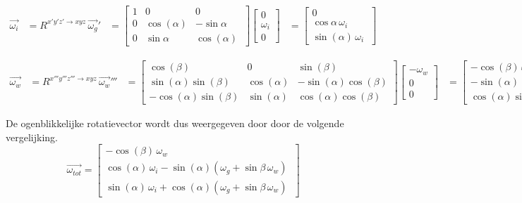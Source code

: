 \begin{equation*}
\begin{split}
\overrightarrow{\omega_{i}}
&=R^{x'y'z' \rightarrow xyz}\,\overrightarrow{\omega_{g}}'
&=	  \begin{bmatrix}
      1 & 0 & 0\\
      0 & \cos(\alpha) & -\sin{\alpha}\\ 
      0 & \sin{\alpha} & \cos(\alpha)\
      \end{bmatrix}
      \begin{bmatrix}
      0\\
      \omega_{i}\\
      0\
      \end{bmatrix}     
&=	  \begin{bmatrix}
      0\\
      \cos{\alpha}\,\omega_{i}\\
      \sin(\alpha)\,\omega_{i}\
      \end{bmatrix}
\end{split}
\end{equation*}

\begin{equation*}
\begin{split}
\overrightarrow{\omega_{w}}
&=R^{x'''y'''z''' \rightarrow xyz}\,\overrightarrow{\omega_{w}}'''
&=	  \begin{bmatrix}
      \cos(\beta) & 0 & \sin(\beta)\\
      \sin(\alpha)\sin(\beta) & \cos(\alpha) & -\sin(\alpha)\cos(\beta)\\
      -\cos(\alpha)\sin(\beta) & \sin(\alpha) & \cos(\alpha)\cos(\beta)\  
      \end{bmatrix}
      \begin{bmatrix}
      -\omega_{w}\\
      0\\
      0\
      \end{bmatrix}
&=    \begin{bmatrix}
      -\cos(\beta)\,\omega_{w}\\
      -\sin(\alpha)\sin(\beta)\,\omega_{w}\\
      \cos(\alpha)\sin(\beta)\,\omega_{w}\
      \end{bmatrix}
\end{split}
\end{equation*}

De ogenblikkelijke rotatievector wordt dus weergegeven door door de volgende vergelijking.
\begin{equation*}
\overrightarrow{\omega_{tot}}=
\begin{bmatrix}
	-\cos(\beta)\,\omega_{w}\\
	\cos(\alpha)\,\omega_{i} - \sin(\alpha)(\omega_{g}+\sin{\beta}\,\omega_{w})\\
	\sin(\alpha)\,\omega_{i} + \cos(\alpha)(\omega_{g}+\sin{\beta}\,\omega_{w})\
\end{bmatrix}
\end{equation*}

